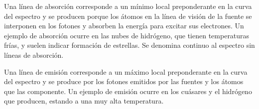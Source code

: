 Una línea de absorción corresponde a un mínimo local preponderante en la curva del espectro y se producen porque los átomos en la línea de visión de la fuente se interponen en los fotones y absorben la energía para excitar sus electrones. Un ejemplo de absorción ocurre en las nubes de hidrógeno, que tienen temperaturas frías, y suelen indicar formación de estrellas. Se denomina continuo al espectro sin líneas de absorción.

Una línea de emisión corresponde a un máximo local preponderante en la curva del espectro y se produce por los fotones emitidos por las fuentes y los átomos que las componente. Un ejemplo de emisión ocurre en los cuásares y el hidrógeno que producen, estando a una muy alta temperatura.
